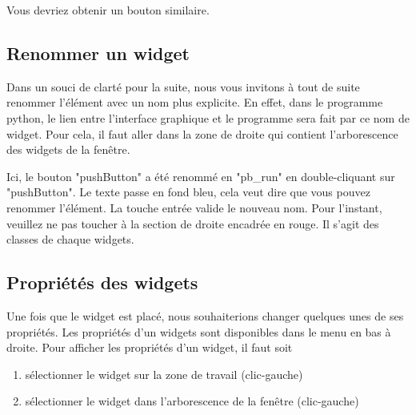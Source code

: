 Vous devriez obtenir un bouton similaire. \newline



\subsection{Renommer un widget}

Dans un souci de clarté pour la suite, nous vous invitons à tout de suite renommer l'élément avec un nom plus explicite. \newline
{\color{red}En effet, dans le programme python, le lien entre l'interface graphique et le programme sera fait par ce nom de widget.} \newline 
Pour cela, il faut aller dans la zone de droite qui contient l'arborescence des widgets de la fenêtre.



Ici, le bouton "pushButton" a été renommé en "pb\_run" en double-cliquant sur "pushButton". Le texte passe en fond bleu, cela veut dire que vous pouvez renommer l'élément. La touche entrée valide le nouveau nom. \newline
Pour l'instant, veuillez ne pas toucher à la section de droite encadrée en rouge. Il s'agit des classes de chaque widgets. 



\subsection{Propriétés des widgets}

Une fois que le widget est placé, nous souhaiterions changer quelques unes de ses propriétés. \newline
Les propriétés d'un widgets sont disponibles dans le menu en bas à droite.
Pour afficher les propriétés d'un widget, il faut soit
\begin{enumerate}
    \item sélectionner le widget sur la zone de travail (clic-gauche)
    \item sélectionner le widget dans l'arborescence de la fenêtre (clic-gauche)
\end{enumerate}

